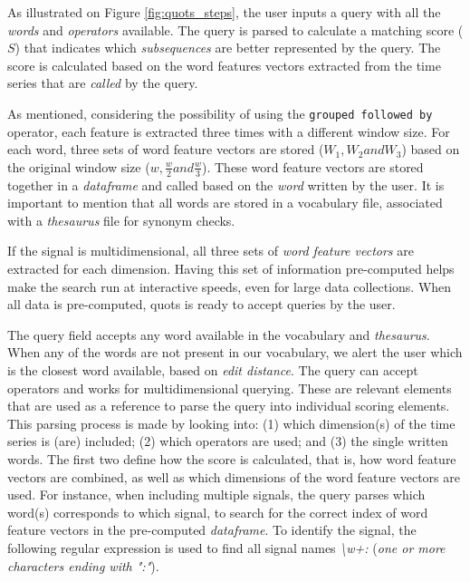 {As illustrated on Figure \ref{fig:quots_steps}, the user inputs a query with all the \textit{words} and \textit{operators} available. The query is parsed to calculate a matching score ($S$) that indicates which \textit{subsequences} are better represented by the query. The score is calculated based on the word features vectors extracted from the time series that are \textit{called} by the query.
\par
As mentioned, considering the possibility of using the \texttt{grouped followed by} operator, each feature is extracted three times with a different window size. For each word, three sets of word feature vectors are stored ($W_1, W_2 and W_3$) based on the original window size ($w, \frac{w}{2} and \frac{w}{3}$). These word feature vectors are stored together in a \textit{dataframe} and called based on the \textit{word} written by the user. It is important to mention that all words are stored in a vocabulary file, associated with a \textit{thesaurus} file for synonym checks.
\par
If the signal is multidimensional, all three sets of \textit{word feature vectors} are extracted for each dimension. Having this set of information pre-computed helps make the search run at interactive speeds, even for large data collections. When all data is pre-computed, \gls{quots} is ready to accept queries by the user. 
\par
The query field accepts any word available in the vocabulary and \textit{thesaurus}. When any of the words are not present in our vocabulary, we alert the user which is the closest word available, based on \textit{edit distance}. The query can accept operators and works for multidimensional querying. These are relevant elements that are used as a reference to parse the query into individual scoring elements. This parsing process is made by looking into: (1) which dimension(s) of the time series is (are) included; (2) which operators are used; and (3) the single written words. The first two define how the score is calculated, that is, how word feature vectors are combined, as well as which dimensions of the word feature vectors are used. For instance, when including multiple signals, the query parses which word(s) corresponds to which signal, to search for the correct index of word feature vectors in the pre-computed \textit{dataframe}. To identify the signal, the following regular expression is used to find all signal names \textit{\textbackslash w+:} (\textit{one or more characters ending with ":"}).
\par
}
